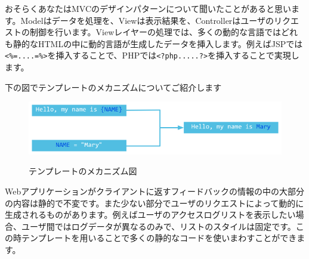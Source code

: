 おそらくあなたはMVCのデザインパターンについて聞いたことがあると思います。Modelはデータを処理を、Viewは表示結果を、Controllerはユーザのリクエストの制御を行います。Viewレイヤーの処理では、多くの動的な言語ではどれも静的なHTMLの中に動的言語が生成したデータを挿入します。例えばJSPでは\texttt{<\%=....=\%>}を挿入することで、PHPでは\texttt{<?php.....?>}を挿入することで実現します。

下の図でテンプレートのメカニズムについてご紹介します

\begin{figure}[H]
  \includegraphics[width=14cm]{7.4.template.png}
   \label{図7.1}
   \caption{テンプレートのメカニズム図}
\end{figure}


Webアプリケーションがクライアントに返すフィードバックの情報の中の大部分の内容は静的で不変です。また少ない部分でユーザのリクエストによって動的に生成されるものがあります。例えばユーザのアクセスログリストを表示したい場合、ユーザ間ではログデータが異なるのみで、リストのスタイルは固定です。この時テンプレートを用いることで多くの静的なコードを使いまわすことができます。
